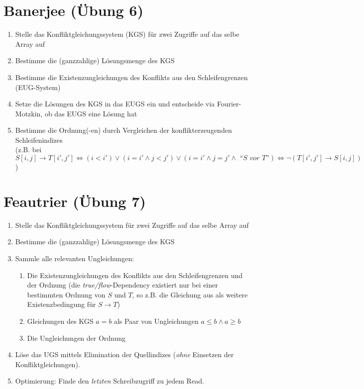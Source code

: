 \documentclass[a4paper,10pt]{article}
\begin{document}
\section{Banerjee (Übung 6)}\label{sec:banerjee}

\begin{enumerate}
    \item Stelle das Konfliktgleichungssystem (KGS) für zwei Zugriffe auf das selbe Array auf
    \item Bestimme die (ganzzahlige) Lösungsmenge des KGS
    \item Bestimme die Existenzungleichungen des Konflikts aus den Schleifengrenzen (EUG-System)
    \item Setze die Lösungen des KGS in das EUGS ein und entscheide via Fourier-Motzkin, ob das EUGS eine Lösung hat
    \item Bestimme die Ordnung(-en) durch Vergleichen der konflikterzeugenden Schleifenindizes\\(z.B. bei
    $S[i,j] \rightarrow T[i',j'] \Leftrightarrow (i<i') \vee (i=i' \wedge j<j') \vee (i=i' \wedge j=j' \wedge \textit{ ``S vor T''}) \Leftrightarrow \neg (T[i',j'] \rightarrow S[i,j])$)
    \label{itm:banerjee-ordnung}
\end{enumerate}

\section{Feautrier (Übung 7)}

\begin{enumerate}
    \item Stelle das Konfliktgleichungssystem für zwei Zugriffe auf das selbe Array auf
    \item Bestimme die (ganzzahlige) Lösungsmenge des KGS
    \item Sammle alle relevanten Ungleichungen:\begin{enumerate}
        \item Die Existenzungleichungen des Konflikts aus den Schleifengrenzen und der Ordnung (die \emph{true/flow}-Dependency existiert nur bei einer bestimmten Ordnung von $S$ und $T$, so z.B. die Gleichung aus   als weitere Existenzbedingung für $S \rightarrow T$)
        \item Gleichungen des KGS $a=b$ als Paar von Ungleichungen $a\leq b\wedge a\geq b$
        \item Die Ungleichungen der Ordnung
    \end{enumerate}
    \item Löse das UGS mittels Elimination der Quellindizes (\textit{ohne} Einsetzen der Konfliktgleichungen).
    \item Optimierung: Finde den \textit{letzten} Schreibzugriff zu jedem Read. 
\end{enumerate}
\end{document}
